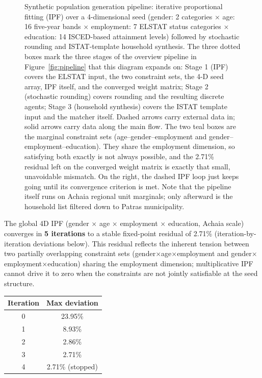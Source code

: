 \documentclass{article}
\begin{document}
\begin{figure}[htbp]
{\begin{tikzpicture}
\end{tikzpicture}%
}
\caption{Synthetic population generation pipeline: iterative proportional fitting
  (IPF) over a 4-dimensional seed (gender: 2 categories $\times$ age: 16 five-year
  bands $\times$ employment: 7 ELSTAT status categories $\times$
  education: 14 ISCED-based attainment levels) followed by stochastic rounding
  and ISTAT-template household synthesis. The three dotted boxes mark the three stages of the overview pipeline in Figure~\ref{fig:pipeline} that this diagram expands on: Stage 1 (IPF) covers the ELSTAT input, the two constraint sets, the 4-D seed array, IPF itself, and the converged weight matrix; Stage 2 (stochastic rounding) covers rounding and the resulting discrete agents; Stage 3 (household synthesis) covers the ISTAT template input and the matcher itself.
  Dashed arrows carry external data in; solid arrows carry data along the main flow.
  The two teal boxes are the marginal constraint sets
  (age--gender--employment and gender--employment--education). They share the
  employment dimension, so satisfying both exactly is not always possible, and the
  2.71\% residual left on the converged weight matrix is exactly that small,
  unavoidable mismatch. On the right, the dashed IPF loop just keeps going until its
  convergence criterion is met. Note that the pipeline itself runs on Achaia regional unit
  marginals; only afterward is the household list filtered down to Patras municipality.}
  \label{fig:ipf}
\end{figure}

The global 4D IPF (gender $\times$ age $\times$ employment $\times$ education, Achaia scale) converges in \textbf{5 iterations} to a stable fixed-point residual of 2.71\% (iteration-by-iteration deviations below). This residual reflects the inherent tension between two partially overlapping constraint sets (gender$\times$age$\times$employment and gender$\times$employment$\times$education) sharing the employment dimension; multiplicative IPF cannot drive it to zero when the constraints are not jointly satisfiable at the seed structure.

\begin{center}
\begin{tabular}{cc}
\toprule
Iteration & Max deviation \\
\midrule
0 & 23.95\% \\
1 &  8.93\% \\
2 &  2.86\% \\
3 &  2.71\% \\
4 &  2.71\% \textnormal{(stopped)} \\
\bottomrule
\end{tabular}
\end{center}
\end{document}
